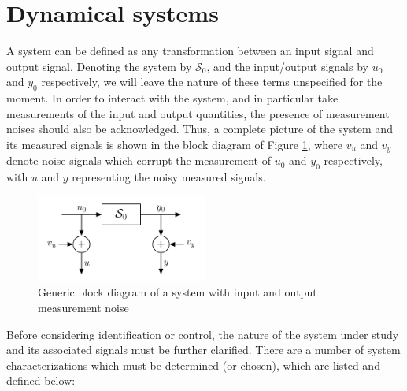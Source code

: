 \section{Dynamical systems}

A system can be defined as any transformation between an input signal and output signal. Denoting the system by $\mathcal{S}_0$, and the input/output signals by $u_0$ and $y_0$ respectively, we will leave the nature of these terms unspecified for the moment. In order to interact with the system, and in particular take measurements of the input and output quantities, the presence of measurement noises should also be acknowledged. Thus, a complete picture of the system and its measured signals is shown in the block diagram of Figure \ref{fig:SysIDoverview}, where $v_u$ and $v_y$ denote noise signals which corrupt the measurement of $u_0$ and $y_0$ respectively, with $u$ and $y$ representing the noisy measured signals.

\begin{figure}[h]
\centering
\includegraphics[width=0.5\textwidth]{Chapter2_SysIDandControl/SysIDoverview.pdf}
\caption{Generic block diagram of a system with input and output measurement noise}
\label{fig:SysIDoverview}
\end{figure}

Before considering identification or control, the nature of the system under study and its associated signals must be further clarified. There are a number of system characterizations which must be determined (or chosen), which are listed and defined below:

